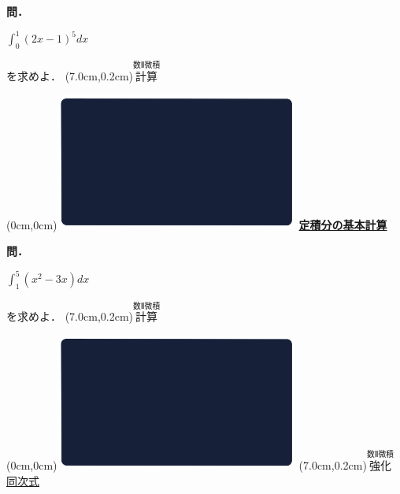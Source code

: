 \documentclass[10pt,
fleqn,
dvipdfmx,
uplatex
]{jsarticle}
\begin{document}
\large 
\bf\boldmath 問．

\Huge 
\vspace{-0.2zw}
\hspace{0.5zw}$\displaystyle\int_0^1\left(2x-1\right)^5dx$
\vspace{-0.2zw}

\large 
\hfill を求めよ．
\at(7.0cm,0.2cm){\small\color{bradorange}$\overset{\text{数Ⅱ微積}}{\text{計算}}$}

\newpage

\at(0cm,0cm){\includegraphics[width=8cm,bb=0 0 1920 1080]{./youtube/thumbnails/templates/smart_background/数II微積.jpeg}}
{\color{orange}\bf\boldmath\LARGE\underline{定積分の基本計算}}\vspace{0.3zw}

\large 
\bf\boldmath 問．

\Huge 
\vspace{-0.2zw}
\hspace{0.2zw}$\displaystyle\int_1^5\left(x^2-3x\right)dx$
\vspace{-0.5zw}

\large
\hfill を求めよ．
\at(7.0cm,0.2cm){\small\color{bradorange}$\overset{\text{数Ⅱ微積}}{\text{計算}}$}

\newpage



\at(0cm,0cm){\includegraphics[width=8cm,bb=0 0 1920 1080]{./youtube/thumbnails/templates/smart_background/数II微積.jpeg}}
\at(7.0cm,0.2cm){\small\color{bradorange}$\overset{\text{数Ⅱ微積}}{\text{強化}}$}
{\color{orange}\huge\underline{同次式}}\vspace{0.3zw}
\end{document}
